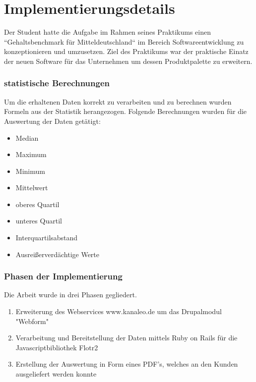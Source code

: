\part{Implementierungsdetails}
Der Student hatte die Aufgabe im Rahmen seines Praktikums einen
``Gehaltsbenchmark für Mitteldeutschland`` im Bereich  Softwareentwicklung zu
konzeptionieren und umzusetzen. Ziel des Praktikums war der praktische Einatz
der neuen Software für das Unternehmen um dessen Produktpalette zu erweitern.
\section{statistische Berechnungen}
Um die erhaltenen Daten korrekt zu verarbeiten und zu berechnen wurden Formeln
aus der Statistik herangezogen. Folgende Berechnungen wurden für die Auswertung
der Daten getätigt:
\begin{itemize}
  \item Median 
  \item Maximum
  \item Minimum
  \item Mittelwert
  \item oberes Quartil
  \item unteres Quartil
  \item Interquartilsabstand
  \item Ausreißerverdächtige Werte
\end{itemize}
\section{Phasen der Implementierung}
Die Arbeit wurde in drei Phasen gegliedert. 
\begin{enumerate}
  \item Erweiterung des Webservices www.kanaleo.de um das Drupalmodul "Webform"
  \item Verarbeitung und Bereitstellung der Daten mittels Ruby on Rails für die
Javascriptbibliothek Flotr2 
  \item Erstellung der Auswertung in Form eines PDF's, welches an den Kunden
ausgeliefert werden konnte
\end{enumerate}
